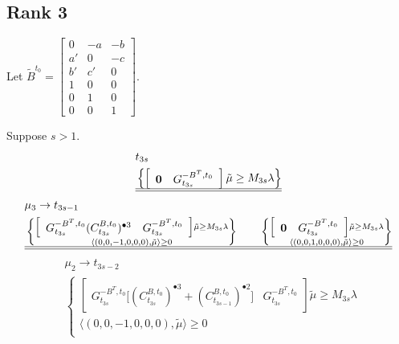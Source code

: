 \documentclass{amsart}
\numberwithin{theorem}{section}
\begin{document}
\begin{landscape}
  \section{Rank 3}
  \label{sec:rank3}
  Let $\tilde B^{t_0}=\left[\begin{array}{ccc} 0 & -a & -b \\ a' & 0 & -c\\ b' & c' & 0\\ 1 & 0 & 0\\ 0 & 1 & 0\\ 0 & 0 & 1\end{array}\right]$.

  Suppose $s>1$.
  \begin{align*}
    &t_{3s}\\ %
    &\left\{
      \left[\begin{array}{cc} \boldsymbol{0} & G^{-B^T,t_0}_{t_{3s}}\end{array}\right] \tilde\mu\ge M_{3s}\lambda
    \right\}\\
    \hline\hline
  \end{align*}
  \begin{align*}
    &\mu_3\to t_{3s-1}\\
    &\left\{\substack{
      \left[\begin{array}{cc} G^{-B^T,t_0}_{t_{3s}} (C^{B,t_0}_{t_{3s}})^{\bullet 3}  & G^{-B^T,t_0}_{t_{3s}}\end{array}\right] \tilde\mu \ge M_{3s}\lambda\\
      \langle(0,0,-1,0,0,0),\tilde\mu\rangle \ge 0
    }\right\}
    \qquad
    \left\{\substack{
      \left[\begin{array}{cc} \boldsymbol{0} & G^{-B^T,t_0}_{t_{3s}}\end{array}\right] \tilde\mu\ge M_{3s}\lambda\\
      \langle(0,0,1,0,0,0),\tilde\mu\rangle\ge 0
      }\right\}\\
    \hline\hline
  \end{align*}
  \begin{align*}
    &\mu_2\to t_{3s-2}\\ %
    &\left\{\substack{
      \left[\begin{array}{cc} G^{-B^T,t_0}_{t_{3s}} \big[ (C^{B,t_0}_{t_{3s}})^{\bullet 3} + (C^{B,t_0}_{t_{3s-1}})^{\bullet 2} \big] & G^{-B^T,t_0}_{t_{3s}}\end{array}\right] \tilde\mu \ge M_{3s}\lambda\\
      \langle(0,0,-1,0,0,0),\tilde\mu\rangle \ge 0\\
}
\end{align*}
\end{landscape}
\end{document}
